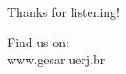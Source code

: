\begin{frame}[t]{Thanks for listening!}
\vfill
\vfill
\begin{varblock}[0.4\textwidth]{}
\begin{center}
{ \Large 
Find us on: \\
\textsf{www.gesar.uerj.br} }
\end{center}
\end{varblock}
\end{frame}
